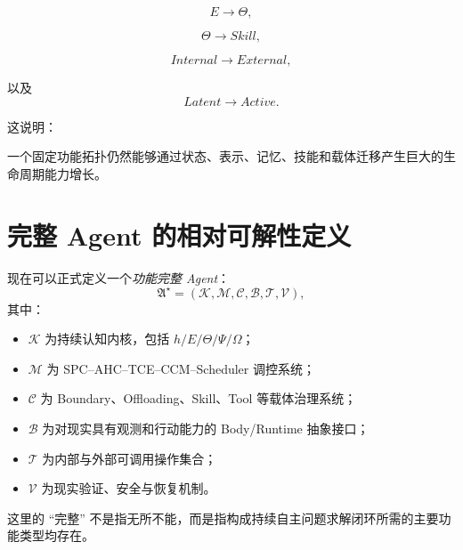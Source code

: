 \begin{equation}
E
\rightarrow
\Theta,
\end{equation}

\begin{equation}
\Theta
\rightarrow
Skill,
\end{equation}

\begin{equation}
Internal
\rightarrow
External,
\end{equation}

以及
\begin{equation}
Latent
\rightarrow
Active.
\end{equation}

这说明：

\begin{statementbox}
\centering
{}
\end{statementbox}

一个固定功能拓扑仍然能够通过状态、表示、记忆、技能和载体迁移产生巨大的生命周期能力增长。

\section{完整 Agent 的相对可解性定义}

现在可以正式定义一个\emph{功能完整 Agent}：
\begin{equation}
\mathfrak A^\star
=
\left(
\mathcal K,
\mathcal M,
\mathcal C,
\mathcal B,
\mathcal T,
\mathcal V
\right),
\end{equation}
其中：

\begin{itemize}
    \item $\mathcal K$ 为持续认知内核，包括 $h/E/\Theta/\Psi/\Omega$；
    \item $\mathcal M$ 为 SPC--AHC--TCE--CCM--Scheduler 调控系统；
    \item $\mathcal C$ 为 Boundary、Offloading、Skill、Tool 等载体治理系统；
    \item $\mathcal B$ 为对现实具有观测和行动能力的 Body/Runtime 抽象接口；
    \item $\mathcal T$ 为内部与外部可调用操作集合；
    \item $\mathcal V$ 为现实验证、安全与恢复机制。
\end{itemize}

这里的 ``完整'' 不是指无所不能，而是指构成持续自主问题求解闭环所需的主要功能类型均存在。

